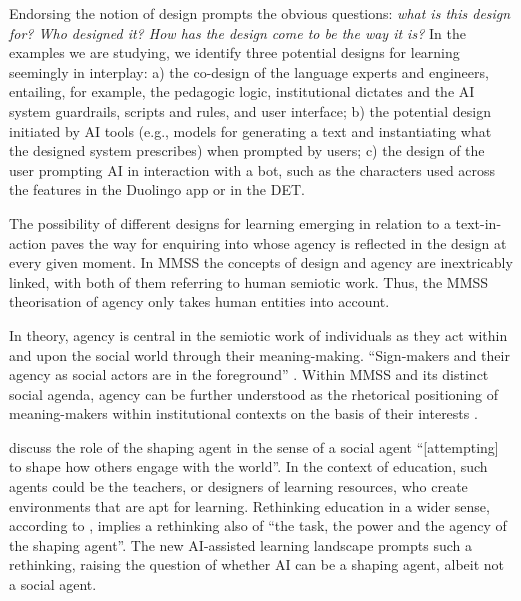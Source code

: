 \documentclass[english]{textolivre}
\begin{document}
Endorsing the notion of design prompts the obvious questions: \textit{what is this design for? Who designed it? How has the design come to be the way it is?} In the examples we are studying, we identify three potential designs for learning seemingly in interplay: a) the co-design of the language experts and engineers, entailing, for example, the pedagogic logic, institutional dictates and the AI system guardrails, scripts and rules, and user interface; b) the potential design initiated by AI tools (e.g., models for generating a text and instantiating what the designed system prescribes) when prompted by users; c) the design of the user prompting AI in interaction with a bot, such as the characters used across the features in the Duolingo app or in the DET.

The possibility of different designs for learning emerging in relation to a text-in-action paves the way for enquiring into whose agency is reflected in the design at every given moment. In MMSS the concepts of design and agency are inextricably linked, with both of them referring to human semiotic work. Thus, the MMSS theorisation of agency only takes human entities into account.

In  theory, agency is central in the semiotic work of individuals as they act within and upon the social world through their meaning-making. “Sign-makers and their agency as social actors are in the foreground” \cite[p. 34]{kress2010multimodality}. Within MMSS and its distinct social agenda, agency can be further understood as the rhetorical positioning of meaning-makers within institutional contexts on the basis of their interests \cite{diamantopoulou2024agency}.

\textcite[p. 134]{bezemer2016multimodality} discuss the role of the shaping agent in the sense of a social agent “[attempting] to shape how others engage with the world”. In the context of education, such agents could be the teachers, or designers of learning resources, who create environments that are apt for learning. Rethinking education in a wider sense, according to \textcite[p. 134]{bezemer2016multimodality}, implies a rethinking also of “the task, the power and the agency of the shaping agent”. The new AI-assisted learning landscape prompts such a rethinking, raising the question of whether AI can be a shaping agent, albeit not a social agent.
\end{document}
